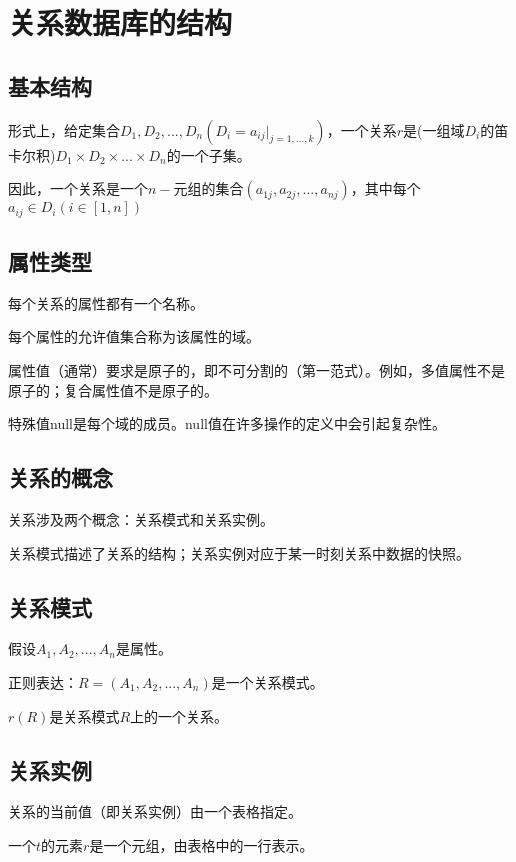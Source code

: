 \section{关系数据库的结构}

\subsection{基本结构}

形式上，给定集合$D_1,D_2,...,D_n(D_i=a_{ij}|_{j=1,...,k})$，一个关系$r$是(一组域$D_i$的笛卡尔积)$D_1\times D_2\times ...\times D_n$的一个子集。

因此，一个关系是一个$n-$元组的集合$(a_{1j},a_{2j},...,a_{nj})$，其中每个$a_{ij}\in D_i(i\in[1,n])$

\subsection{属性类型}

每个关系的属性都有一个名称。

每个属性的允许值集合称为该属性的域。

属性值（通常）要求是原子的，即不可分割的（第一范式）。例如，多值属性不是原子的；复合属性值不是原子的。

特殊值null是每个域的成员。null值在许多操作的定义中会引起复杂性。

\subsection{关系的概念}

关系涉及两个概念：关系模式和关系实例。

关系模式描述了关系的结构；关系实例对应于某一时刻关系中数据的快照。

\subsection{关系模式}

假设$A_1,A_2,...,A_n$是属性。

正则表达：$R=(A_1,A_2,...,A_n)$是一个关系模式。

$r(R)$是关系模式$R$上的一个关系。

\subsection{关系实例}

关系的当前值（即关系实例）由一个表格指定。

一个$t$的元素$r$是一个元组，由表格中的一行表示。


